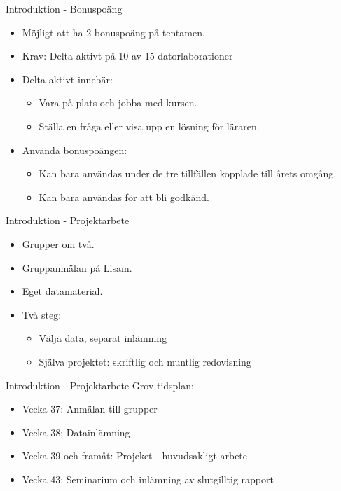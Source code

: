 \documentclass[10pt,english]{beamer}
\begin{document}
\begin{frame}{Introduktion - Bonuspoäng}
    \begin{itemize}
        \item Möjligt att ha 2 bonuspoäng på tentamen.
        \item Krav: Delta aktivt på 10 av 15 datorlaborationer 
        \item Delta aktivt innebär:
        \begin{itemize}
            \item Vara på plats och jobba med kursen.
            \item Ställa en fråga eller visa upp en lösning för läraren.
        \end{itemize}
        \item Använda bonuspoängen:
        \begin{itemize}
            \item Kan bara användas under de tre tillfällen kopplade till årets omgång.
            \item Kan bara användas för att bli godkänd.
        \end{itemize}
    \end{itemize}
\end{frame}

\begin{frame}{Introduktion - Projektarbete}
    \begin{itemize}
        \item Grupper om två.
        \item Gruppanmälan på Lisam.
        \item Eget datamaterial.
        \item Två steg:
          \begin{itemize}
            \item Välja data, separat inlämning
            \item Själva projektet: skriftlig och muntlig redovisning
          \end{itemize}
    \end{itemize}
\end{frame}

\begin{frame}{Introduktion - Projektarbete}
    Grov tidsplan:
    \begin{itemize}
        \item Vecka 37: Anmälan till grupper 
        \item Vecka 38: Datainlämning
        \item Vecka 39 och framåt: Projeket - huvudsakligt arbete
        \item Vecka 43: Seminarium och inlämning av slutgilltig rapport
    \end{itemize}
\end{frame}
\end{document}
